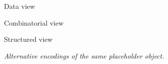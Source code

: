 \begin{center}
    \begin{minipage}[t]{0.31\linewidth}
        \centering
        

        \small Data view
    \end{minipage}\hfill
    \begin{minipage}[t]{0.31\linewidth}
        \centering
        

        \small Combinatorial view
    \end{minipage}\hfill
    \begin{minipage}[t]{0.31\linewidth}
        \centering
        

        \small Structured view
    \end{minipage}

    \medskip
    \textit{Alternative encodings of the same placeholder object.}
\end{center}
